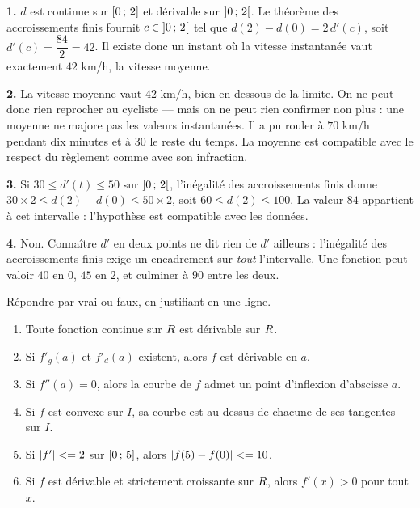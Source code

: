 \begin{corrige}
\textbf{1.} $d$ est continue sur $\left[0\,;\,2\right]$ et dérivable sur
$\left]0\,;\,2\right[$. Le théorème des accroissements finis fournit
$c \in \left]0\,;\,2\right[$ tel que $d(2)-d(0) = 2\,d'(c)$, soit
$d'(c) = \dfrac{84}{2} = 42$. Il existe donc un instant où la vitesse
instantanée vaut exactement $42$ km/h, la vitesse moyenne.

\textbf{2.} La vitesse moyenne vaut $42$ km/h, bien en dessous de la limite.
On ne peut donc rien reprocher au cycliste — mais on ne peut rien confirmer non
plus : une moyenne ne majore pas les valeurs instantanées. Il a pu rouler à
$70$ km/h pendant dix minutes et à $30$ le reste du temps. La moyenne est
compatible avec le respect du règlement comme avec son infraction.

\textbf{3.} Si $30 \leq d'(t) \leq 50$ sur $\left]0\,;\,2\right[$, l'inégalité
des accroissements finis donne
$30 \times 2 \leq d(2)-d(0) \leq 50 \times 2$, soit
$60 \leq d(2) \leq 100$. La valeur $84$ appartient à cet intervalle :
l'hypothèse est compatible avec les données.

\textbf{4.} Non. Connaître $d'$ en deux points ne dit rien de $d'$ ailleurs :
l'inégalité des accroissements finis exige un encadrement sur \emph{tout}
l'intervalle. Une fonction peut valoir $40$ en $0$, $45$ en $2$, et culminer à
$90$ entre les deux.
\end{corrige}


\begin{jemeteste}
Répondre par vrai ou faux, en justifiant en une ligne.

\begin{enumerate}[label=\textbf{\arabic*.}, leftmargin=*, itemsep=0.28em]
  \item Toute fonction continue sur $R$ est dérivable sur $R$.
  \item Si $f'_{g}(a)$ et $f'_{d}(a)$ existent, alors $f$ est dérivable en $a$.
  \item Si $f''(a) = 0$, alors la courbe de $f$ admet un point d'inflexion
        d'abscisse $a$.
  \item Si $f$ est convexe sur $I$, sa courbe est au-dessus de chacune de ses
        tangentes sur $I$.
  \item Si $\left|f'\right| <= 2$ sur $\left[0\,;\,5\right]$, alors
        $\left|f(5)-f(0)\right| <= 10$.
  \item Si $f$ est dérivable et strictement croissante sur $R$, alors
        $f'(x) > 0$ pour tout $x$.
\end{enumerate}
\end{jemeteste}

